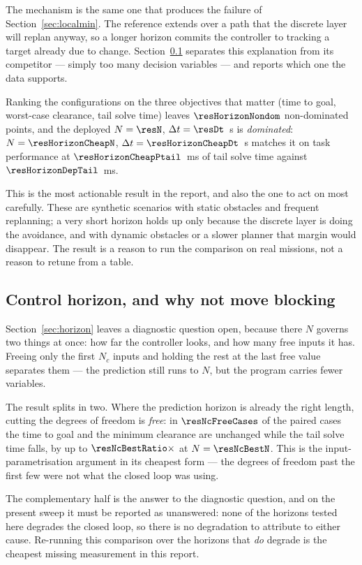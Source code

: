 \documentclass[11pt,a4paper]{article}
\newcommand{\Ninput}{N_c}
\begin{document}
The mechanism is the same one that produces the failure of Section~\ref{sec:localmin}. The reference extends
over a path that the discrete layer will replan anyway, so a longer horizon commits the controller to
tracking a target already due to change. Section~\ref{sec:nc} separates this explanation from its
competitor --- simply too many decision variables --- and reports which one the data supports.

Ranking the configurations on the three objectives that matter (time to goal, worst-case clearance, tail
solve time) leaves $\resHorizonNondom$ non-dominated points, and the deployed $N=\resN$,
$\Delta t=\resDt$~s is \emph{dominated}: $N=\resHorizonCheapN$, $\Delta t=\resHorizonCheapDt$~s matches it on
task performance at $\resHorizonCheapPtail$~ms of tail solve time against $\resHorizonDepTail$~ms.

This is the most actionable result in the report, and also the one to act on most carefully. These are
synthetic scenarios with static obstacles and frequent replanning; a very short horizon holds up only because
the discrete layer is doing the avoidance, and with dynamic obstacles or a slower planner that margin would
disappear. The result is a reason to run the comparison on real missions, not a reason to retune from a
table.

\subsection{Control horizon, and why not move blocking}
\label{sec:nc}

Section~\ref{sec:horizon} leaves a diagnostic question open, because there $N$ governs two things at once:
how far the controller looks, and how many free inputs it has. Freeing only the first $\Ninput$ inputs and
holding the rest at the last free value separates them --- the prediction still runs to $N$, but the program
carries fewer variables.


The result splits in two. Where the prediction horizon is already the right length, cutting the degrees of
freedom is \emph{free}: in $\resNcFreeCases$ of the paired cases the time to goal and the minimum clearance
are unchanged while the tail solve time falls, by up to $\resNcBestRatio\times$ at $N=\resNcBestN$. This is
the input-parametrisation argument in its cheapest form --- the degrees of freedom past the first few were
not what the closed loop was using.

The complementary half is the answer to the diagnostic question, and on the present sweep it must be reported
as unanswered: none of the horizons tested here degrades the closed loop, so there is no degradation to
attribute to either cause. Re-running this comparison over the horizons that \emph{do} degrade is the
cheapest missing measurement in this report.
\end{document}
